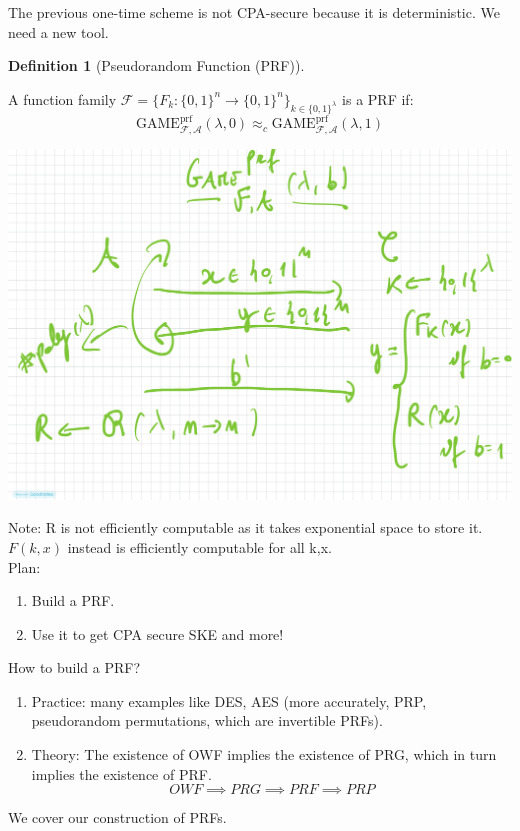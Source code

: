 \documentclass[11pt, a4paper]{article}
\newcommand{\game}{\text{GAME}}
\newtheorem{defn}{Definition}
\begin{document}
The previous one-time scheme is not CPA-secure because it is deterministic. We need a new tool.
\begin{defn}[Pseudorandom Function (PRF)]
    
\end{defn}
A function family $\mathcal{F} = \{F_k : \{0,1\}^n \to \{0,1\}^n\}_{k \in \{0,1\}^\lambda}$ is a PRF if:
$$\game_{\mathcal{F},\mathcal{A}}^{\text{prf}}(\lambda,0) \approx_c \game_{\mathcal{F},\mathcal{A}}^{\text{prf}}(\lambda,1)$$
\begin{center}
    \includegraphics[scale=0.4]{img/Comp_sec/prf.png}
\end{center}
Note: R is not efficiently computable as it takes exponential space to store it. $F(k,x)$ instead is efficiently computable for all k,x.\\
Plan:
\begin{enumerate}
    \item Build a PRF.
    \item Use it to get CPA secure SKE and more!
\end{enumerate}
How to build a PRF?
\begin{enumerate}
    \item Practice: many examples like DES, AES (more accurately, PRP, pseudorandom permutations, which are invertible PRFs).
    \item Theory: The existence of OWF implies the existence of PRG, which in turn implies the existence of PRF.
    $$OWF \implies PRG \implies PRF \implies PRP$$
\end{enumerate}
We cover our construction of PRFs.
\end{document}
